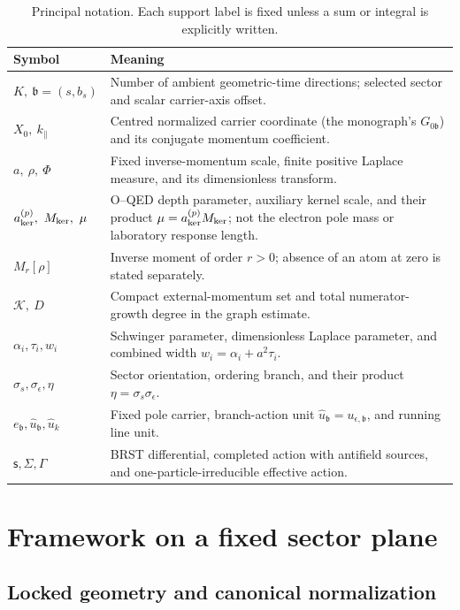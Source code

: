 \documentclass[final,5p,times,twocolumn,numbers,nopreprintline]{elsarticle}
\numberwithin{equation}{section}
\theoremstyle{definition}
\theoremstyle{remark}
\newcommand{\bb}{\mathfrak b}
\newcommand{\BR}{\mathsf s}
\newcommand{\Ph}{\Phi}
\newcommand{\ee}{e_{\bb}}
\begin{document}
\begin{table}[t]
\centering
\small
\renewcommand{\arraystretch}{1.15}
\caption{Principal notation. Each support label is fixed unless a sum
or integral is explicitly written.}
\label{tab:notation}
\begin{tabularx}{\textwidth}{@{}>{\raggedright\arraybackslash}p{}X@{}}
\toprule
Symbol & Meaning\\
\midrule
\(K,\ \bb=(s,b_s)\) & Number of ambient geometric-time directions;
selected sector and scalar carrier-axis offset.\\
\(X_0,\ k_\parallel\) & Centred normalized carrier coordinate (the monograph's
\(G_{0\bb}\)) and its conjugate momentum coefficient.\\
\(a,\ \rho,\ \Ph\) & Fixed inverse-momentum scale, finite positive
Laplace measure, and its dimensionless transform.\\
\(a_{\rm ker}^{(p)},\ M_{\rm ker},\ \mu\) & O--QED depth parameter,
auxiliary kernel scale, and their product \(\mu=a_{\rm ker}^{(p)}M_{\rm ker}\);
not the electron pole mass or laboratory response length.\\
\(M_r[\rho]\) & Inverse moment of order \(r>0\); absence of an atom
at zero is stated separately.\\
\(\mathcal K,\ D\) & Compact external-momentum set and total
numerator-growth degree in the graph estimate.\\
\(\alpha_i,\tau_i,w_i\) & Schwinger parameter, dimensionless Laplace
parameter, and combined width \(w_i=\alpha_i+a^2\tau_i\).\\
\(\sigma_s,\sigma_\epsilon,\eta\) & Sector orientation, ordering
branch, and their product \(\eta=\sigma_s\sigma_\epsilon\).\\
\(\ee,\hat u_{\bb},\widehat u_k\) & Fixed pole carrier, branch-action unit
\(\hat u_{\bb}=u_{\epsilon,\bb}\), and running line unit.\\
\(\BR,\Sigma,\Gamma\) & BRST differential, completed action with
antifield sources, and one-particle-irreducible effective action.\\
\bottomrule
\end{tabularx}
\end{table}

\section{Framework on a fixed sector plane}
\label{sec:framework}

\subsection{Locked geometry and canonical normalization}
\end{document}
